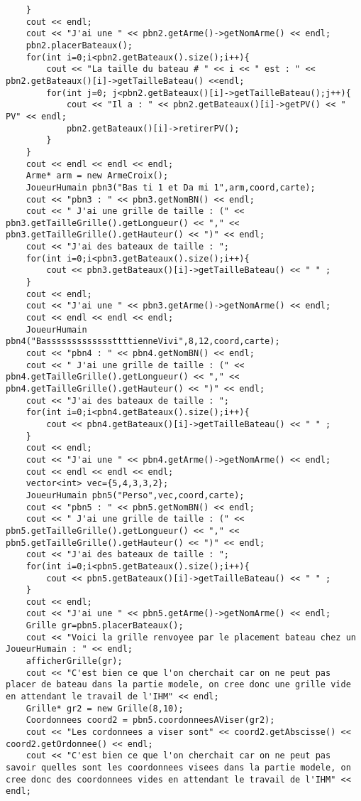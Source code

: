 \begin{lstlisting}
	}
	cout << endl;
	cout << "J'ai une " << pbn2.getArme()->getNomArme() << endl;
	pbn2.placerBateaux();
	for(int i=0;i<pbn2.getBateaux().size();i++){
		cout << "La taille du bateau # " << i << " est : " << pbn2.getBateaux()[i]->getTailleBateau() <<endl;
		for(int j=0; j<pbn2.getBateaux()[i]->getTailleBateau();j++){
			cout << "Il a : " << pbn2.getBateaux()[i]->getPV() << " PV" << endl;
			pbn2.getBateaux()[i]->retirerPV();
		}
	}
	cout << endl << endl << endl;
	Arme* arm = new ArmeCroix();
	JoueurHumain pbn3("Bas ti 1 et Da mi 1",arm,coord,carte);
	cout << "pbn3 : " << pbn3.getNomBN() << endl;
	cout << " J'ai une grille de taille : (" << pbn3.getTailleGrille().getLongueur() << "," << pbn3.getTailleGrille().getHauteur() << ")" << endl;
	cout << "J'ai des bateaux de taille : ";
	for(int i=0;i<pbn3.getBateaux().size();i++){
		cout << pbn3.getBateaux()[i]->getTailleBateau() << " " ;
	}
	cout << endl;
	cout << "J'ai une " << pbn3.getArme()->getNomArme() << endl;
	cout << endl << endl << endl;
	JoueurHumain pbn4("BasssssssssssssttttienneVivi",8,12,coord,carte);
	cout << "pbn4 : " << pbn4.getNomBN() << endl;
	cout << " J'ai une grille de taille : (" << pbn4.getTailleGrille().getLongueur() << "," << pbn4.getTailleGrille().getHauteur() << ")" << endl;
	cout << "J'ai des bateaux de taille : ";
	for(int i=0;i<pbn4.getBateaux().size();i++){
		cout << pbn4.getBateaux()[i]->getTailleBateau() << " " ;
	}
	cout << endl;
	cout << "J'ai une " << pbn4.getArme()->getNomArme() << endl;
	cout << endl << endl << endl;
	vector<int> vec={5,4,3,3,2};
	JoueurHumain pbn5("Perso",vec,coord,carte);
	cout << "pbn5 : " << pbn5.getNomBN() << endl;
	cout << " J'ai une grille de taille : (" << pbn5.getTailleGrille().getLongueur() << "," << pbn5.getTailleGrille().getHauteur() << ")" << endl;
	cout << "J'ai des bateaux de taille : ";
	for(int i=0;i<pbn5.getBateaux().size();i++){
		cout << pbn5.getBateaux()[i]->getTailleBateau() << " " ;
	}
	cout << endl;
	cout << "J'ai une " << pbn5.getArme()->getNomArme() << endl;
	Grille gr=pbn5.placerBateaux();
	cout << "Voici la grille renvoyee par le placement bateau chez un JoueurHumain : " << endl;
	afficherGrille(gr);
	cout << "C'est bien ce que l'on cherchait car on ne peut pas placer de bateau dans la partie modele, on cree donc une grille vide en attendant le travail de l'IHM" << endl;
	Grille* gr2 = new Grille(8,10);
	Coordonnees coord2 = pbn5.coordonneesAViser(gr2);
	cout << "Les cordonnees a viser sont" << coord2.getAbscisse() << coord2.getOrdonnee() << endl;
	cout << "C'est bien ce que l'on cherchait car on ne peut pas savoir quelles sont les coordonnees visees dans la partie modele, on cree donc des coordonnees vides en attendant le travail de l'IHM" << endl;

\end{lstlisting}
